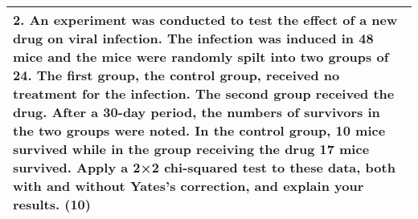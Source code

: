 \documentclass[a4paper,12pt]{article}
\begin{document}
\begin{table}[ht!]
     

\centering
     

\begin{tabular}{|p{15cm}|}
     

\hline 

 
 
2. An experiment was conducted to test the effect of a new drug on viral infection.  
The infection was induced in 48 mice and the mice were randomly spilt into two groups of 24.  
The first group, the control group, received no treatment for the infection.  
The second group received the drug.  After a 30-day period, the numbers of survivors in the two groups were noted.  In the control group, 10 mice survived while in the group receiving the drug 17 mice survived.  Apply a 2×2 chi-squared test to these data, both with and without Yates's correction, and explain your results. (10) 
\\ \hline


\end{tabular}
    

\end{table}
\end{document}
